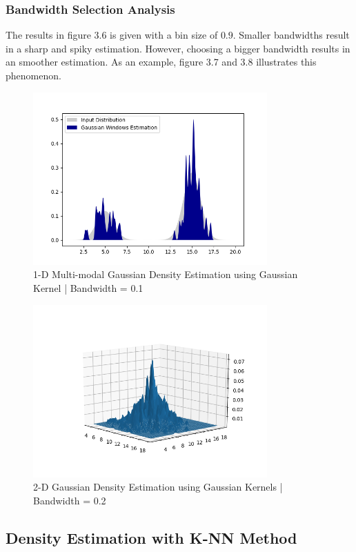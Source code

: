 \documentclass[12pt]{article}
\numberwithin{equation}{section}
\numberwithin{table}{section}
\numberwithin{figure}{section}
\begin{document}
\subsubsection*{Bandwidth Selection Analysis}
The results in figure 3.6 is given with a bin size of $0.9$. Smaller bandwidths result in a sharp and spiky estimation. However, choosing a bigger bandwidth results in an smoother estimation. As an example, figure 3.7 and 3.8 illustrates this phenomenon.
	\begin{figure}[!h]\centering
	\includegraphics[width=0.8\textwidth]{3_b_3.PNG}
	\caption{1-D Multi-modal Gaussian Density Estimation using Gaussian Kernel | Bandwidth = 0.1}
	\label{pl1}
\end{figure}

	\begin{figure}[!h]\centering
	\includegraphics[width=0.8\textwidth]{3_b_4.PNG}
	\caption{2-D Gaussian Density Estimation using Gaussian Kernels | Bandwidth = 0.2}
	\label{pl1}
\end{figure}

\subsection*{Density Estimation with K-NN Method}
\end{document}
